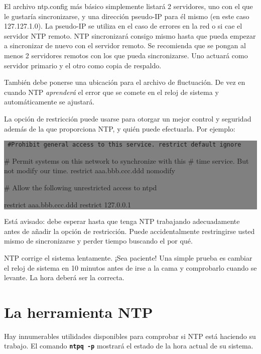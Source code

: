 \documentclass[12pt]{article}
\begin{document}
	El archivo ntp.config más básico simplemente listará 2 servidores, uno
con el que le gustaría sincronizarse, y una dirección pseudo-IP para él 
mismo (en este caso 127.127.1.0). La pseudo-IP se utiliza en el caso de
errores en la red o si cae el servidor NTP remoto. NTP sincronizará
consigo mismo hasta que pueda empezar a sincronizar de nuevo con el 
servidor remoto. Se recomienda que se pongan al menos 2 servidores remotos
con los que pueda sincronizarse. Uno actuará como servidor primario y el 
otro como copia de respaldo.



También debe ponerse una ubicación para el archivo de fluctuación. De 
vez en cuando NTP \textit{aprenderá} el error que se comete en el reloj de
sistema y automáticamente se ajustará.



La opción de restricción puede usarse para otorgar un mejor control y 
seguridad además de la que proporciona NTP, y quién puede efectuarla.
Por ejemplo:

\colorbox{grey}{\parbox[t]{0.95\linewidth}{ \vspace*{0.5cm} {\tt 
\#Prohibit general access to this service.
restrict default ignore

\# Permit systems on this network to synchronize with this
\# time service. But not modify our time.
restrict aaa.bbb.ccc.ddd nomodify

\# Allow the following unrestricted access to ntpd

restrict aaa.bbb.ccc.ddd
restrict 127.0.0.1
 } \vspace*{0.5cm} } } 


Está avisado: debe esperar hasta que tenga NTP trabajando adecuadamente 
antes de añadir la opción de restricción. Puede accidentalmente 
restringirse usted mismo de sincronizarse y perder tiempo buscando el por qué.



NTP corrige el sistema lentamente. ¡Sea paciente! Una simple prueba es
cambiar el reloj de sistema en 10 minutos antes de irse a la cama y
comprobarlo cuando se levante. La hora deberá ser la correcta.

\section*{ La herramienta NTP}


Hay innumerables utilidades disponibles para comprobar si NTP está 
haciendo su trabajo. El comando \texttt{\textbf{ntpq -p}} mostrará el estado de la hora
actual de su sistema.
\end{document}
